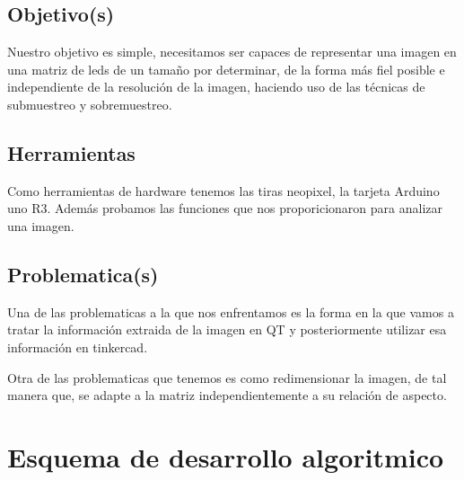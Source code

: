 \documentclass{article}
\begin{document}
    \begin{flushleft}
    \subsection{Objetivo(s)}
    Nuestro objetivo es simple, necesitamos ser capaces de representar una imagen en una matriz de leds de un tamaño por determinar, de la forma más fiel posible e independiente de la resolución de la imagen, haciendo uso de las técnicas de submuestreo y sobremuestreo. 
    \end{flushleft}
    \vspace*{0.5cm}
    \begin{flushleft}
    \subsection{Herramientas}
    Como herramientas de hardware tenemos las tiras neopixel, la tarjeta Arduino uno R3. Además probamos las funciones que nos proporicionaron para analizar una imagen. 
    \end{flushleft}
    \vspace*{0.5cm}
    \begin{flushleft}
    \subsection{Problematica(s)}
     Una de las problematicas a la que nos enfrentamos es la forma en la que vamos a tratar la información extraida de la imagen en QT y posteriormente utilizar esa información en tinkercad.
     
     \vspace*{0.1cm}
     
     Otra de las problematicas que tenemos es como redimensionar la imagen, de tal manera que, se adapte a la matriz independientemente a su relación de aspecto.   
    \end{flushleft}
    \vspace*{2cm}
    
\newpage  
    
\section{Esquema de desarrollo algoritmico}
\label{esquema}
    \begin{flushleft}

    \end{flushleft}
\newpage
    
\end{document}
